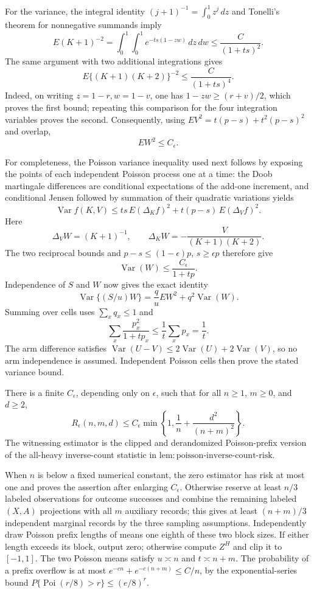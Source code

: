 For the variance, the integral identity \((j+1)^{-1}=\int_0^1z^j\,dz\) and Tonelli's theorem for nonnegative summands imply
\[
 E(K+1)^{-2}=\int_0^1\!\int_0^1e^{-ts(1-zw)}\,dz\,dw
 \le \frac{C}{(1+ts)^2}.
\]
The same argument with two additional integrations gives
\[
 E\{(K+1)(K+2)\}^{-2}\le \frac{C}{(1+ts)^4}.
\]
Indeed, on writing \(z=1-r,w=1-v\), one has \(1-zw\ge(r+v)/2\), which proves the first bound; repeating this comparison for the four integration variables proves the second.  Consequently, using \(EV^2=t(p-s)+t^2(p-s)^2\) and overlap,
\[
 EW^2\le C_\epsilon.
\]

For completeness, the Poisson variance inequality used next follows by exposing the points of each independent Poisson process one at a time: the Doob martingale differences are conditional expectations of the add-one increment, and conditional Jensen followed by summation of their quadratic variations yields
\[
 \operatorname{Var}f(K,V)\le ts\,E(\Delta_Kf)^2+t(p-s)\,E(\Delta_Vf)^2.
\]
Here
\[
 \Delta_VW=(K+1)^{-1},\qquad
 \Delta_KW=-\frac{V}{(K+1)(K+2)}.
\]
The two reciprocal bounds and \(p-s\le(1-\epsilon)p\), \(s\ge\epsilon p\) therefore give
\[
 \operatorname{Var}(W)\le \frac{C_\epsilon}{1+tp}.
\]
Independence of \(S\) and \(W\) now gives the exact identity
\[
 \operatorname{Var}\{(S/u)W\}=\frac q uEW^2+q^2\operatorname{Var}(W).
\]
Summing over cells uses \(\sum_xq_x\le1\) and
\[
 \sum_x\frac{p_x^2}{1+tp_x}\le \frac1t\sum_xp_x=\frac1t.
\]
The arm difference satisfies \(\operatorname{Var}(U-V)\le2\operatorname{Var}(U)+2\operatorname{Var}(V)\), so no arm independence is assumed.  Independent Poisson cells then prove the stated variance bound.

There is a finite \(C_\epsilon\), depending only on \(\epsilon\), such that for all \(n\ge1\), \(m\ge0\), and \(d\ge2\),
\[
 R_\epsilon(n,m,d)\le C_\epsilon\min\!\left\{1,\frac1n+\frac{d^2}{(n+m)^2}\right\}.
\]
The witnessing estimator is the clipped and derandomized Poisson-prefix version of the all-heavy inverse-count statistic in \(\mathrm{lem:poisson\mbox{-}inverse\mbox{-}count\mbox{-}risk}\).

When \(n\) is below a fixed numerical constant, the zero estimator has risk at most one and proves the assertion after enlarging \(C_\epsilon\).  Otherwise reserve at least \(n/3\) labeled observations for outcome successes and combine the remaining labeled \((X,A)\) projections with all \(m\) auxiliary records; this gives at least \((n+m)/3\) independent marginal records by the three sampling assumptions.  Independently draw Poisson prefix lengths of means one eighth of these two block sizes.  If either length exceeds its block, output zero; otherwise compute \(Z^H\) and clip it to \([-1,1]\).  The two Poisson means satisfy \(u\asymp n\) and \(t\asymp n+m\).  The probability of a prefix overflow is at most \(e^{-c n}+e^{-c(n+m)}\le C/n\), by the exponential-series bound \(P\{\operatorname{Poi}(r/8)>r\}\le(e/8)^{r}\).

